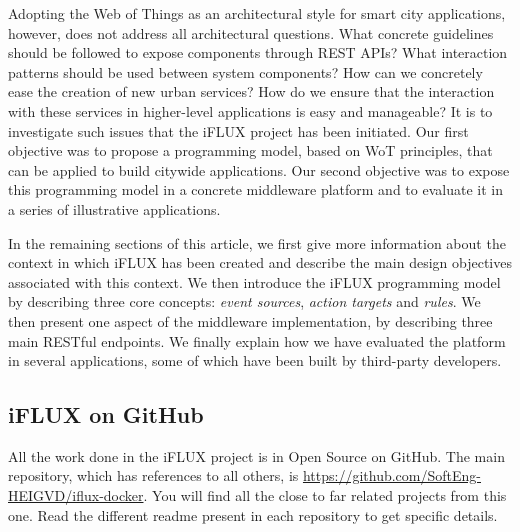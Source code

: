 Adopting the Web of Things as an architectural style for smart city applications, however, does not address all architectural questions. What concrete guidelines should be followed to expose components through REST APIs? What interaction patterns should be used between system components? How can we concretely ease the creation of new urban services? How do we ensure that the interaction with these services in higher-level applications is easy and manageable? It is to investigate such issues that the iFLUX project has been initiated. Our first objective was to propose a programming model, based on WoT principles, that can be applied to build citywide applications. Our second objective was to expose this programming model in a concrete middleware platform and to evaluate it in a series of illustrative applications.

In the remaining sections of this article, we first give more information about the context in which iFLUX has been created and describe the main design objectives associated with this context. We then introduce the iFLUX programming model by describing three core concepts: \emph{event sources}, \emph{action targets} and \emph{rules}. We then present one aspect of the middleware implementation, by describing three main RESTful endpoints. We finally explain how we have evaluated the platform in several applications, some of which have been built by third-party developers.

\subsection{iFLUX on GitHub}

All the work done in the iFLUX project is in Open Source on GitHub. The main repository, which has references to all others, is \url{https://github.com/SoftEng-HEIGVD/iflux-docker}. You will find all the close to far related projects from this one. Read the different readme present in each repository to get specific details.